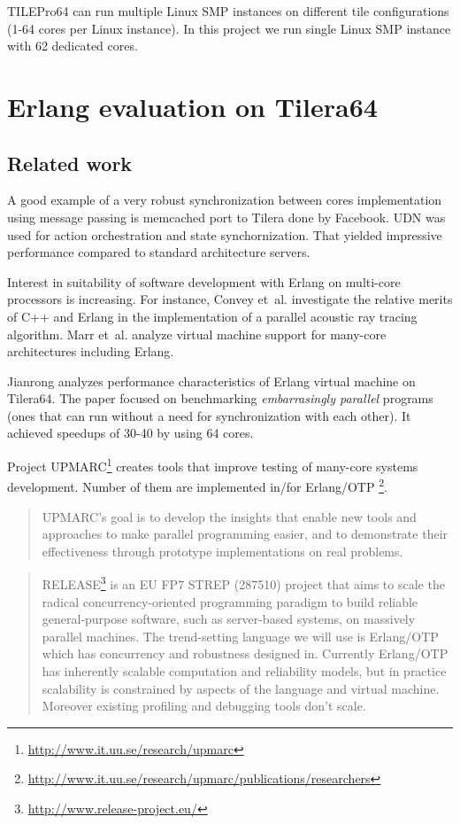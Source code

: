 \documentclass[english,11pt]{l4proj}
\begin{document}
TILEPro64 can run multiple Linux SMP instances on different tile configurations
(1-64 cores per Linux instance). In this project we run single Linux SMP
instance with 62 dedicated cores.

\section{Erlang evaluation on Tilera64}
\label{sec:erlang-eval}

\subsection{Related work}

A good example of a very robust synchronization between cores implementation
using message passing is memcached port to Tilera done by Facebook. UDN was used
for action orchestration and state synchornization\cite{facebook-tilera}. That
yielded impressive performance compared to standard architecture servers.

Interest in suitability of software development with Erlang on multi-core
processors is increasing. For instance, Convey et~al.\cite{erlang-acoustic}
investigate the relative merits of C++ and Erlang in the implementation of a
parallel acoustic ray tracing algorithm. Marr et~al.\cite{vm-manycore} analyze
virtual machine support for many-core architectures including Erlang.

Jianrong \cite{erlang-manycore-scalability} analyzes performance characteristics
of Erlang virtual machine on Tilera64. The paper focused on benchmarking
\emph{embarrasingly parallel} programs (ones that can run without a need for
synchronization with each other). It achieved speedups of 30-40 by using 64
cores.

Project UPMARC\footnote{\url{http://www.it.uu.se/research/upmarc}} creates tools
that improve testing of many-core systems development. Number of them are
implemented in/for
Erlang/OTP
\footnote{\url{http://www.it.uu.se/research/upmarc/publications/researchers}}.

\begin{quote}
UPMARC's goal is to develop the insights that enable new tools and approaches to
make parallel programming easier, and to demonstrate their effectiveness through
prototype implementations on real problems.
\end{quote}

\begin{quote}
RELEASE\footnote{\url{http://www.release-project.eu/}} is an EU FP7 STREP
(287510) project that aims to scale the radical concurrency-oriented programming
paradigm to build reliable general-purpose software, such as server-based
systems, on massively parallel machines. The trend-setting language we will use
is Erlang/OTP which has concurrency and robustness designed in. Currently
Erlang/OTP has inherently scalable computation and reliability models, but in
practice scalability is constrained by aspects of the language and virtual
machine. Moreover existing profiling and debugging tools don't scale.
\end{quote}
\end{document}
